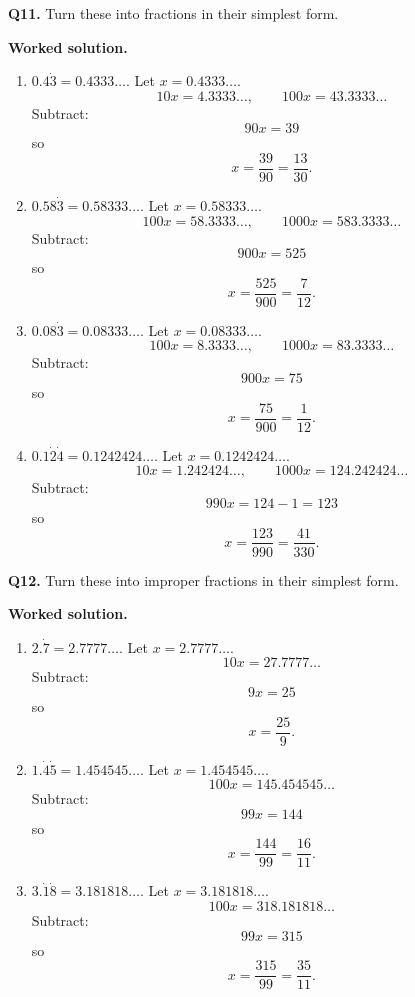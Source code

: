 \documentclass[12pt,a4paper]{article}
\newcommand{\wsol}{%
  \par\smallskip
  \noindent\textbf{\color{blue!50!black}Worked solution.}\space}
\begin{document}
\medskip
\noindent\textbf{Q11.} Turn these into fractions in their simplest form.
\wsol
\begin{enumerate}[label=(\alph*),leftmargin=*]
\item $0.4\dot{3}=0.4333\ldots$. Let $x=0.4333\ldots$.
\[
10x=4.3333\ldots,\qquad 100x=43.3333\ldots
\]
Subtract:
\[
90x=39
\]
so
\[
x=\frac{39}{90}=\frac{13}{30}.
\]

\item $0.58\dot{3}=0.58333\ldots$. Let $x=0.58333\ldots$.
\[
100x=58.3333\ldots,\qquad 1000x=583.3333\ldots
\]
Subtract:
\[
900x=525
\]
so
\[
x=\frac{525}{900}=\frac{7}{12}.
\]

\item $0.08\dot{3}=0.08333\ldots$. Let $x=0.08333\ldots$.
\[
100x=8.3333\ldots,\qquad 1000x=83.3333\ldots
\]
Subtract:
\[
900x=75
\]
so
\[
x=\frac{75}{900}=\frac{1}{12}.
\]

\item $0.1\dot{2}\dot{4}=0.1242424\ldots$. Let $x=0.1242424\ldots$.
\[
10x=1.242424\ldots,\qquad 1000x=124.242424\ldots
\]
Subtract:
\[
990x=124-1=123
\]
so
\[
x=\frac{123}{990}=\frac{41}{330}.
\]
\end{enumerate}

\medskip
\noindent\textbf{Q12.} Turn these into improper fractions in their simplest form.
\wsol
\begin{enumerate}[label=(\alph*),leftmargin=*]
\item $2.\dot{7}=2.7777\ldots$. Let $x=2.7777\ldots$.
\[
10x=27.7777\ldots
\]
Subtract:
\[
9x=25
\]
so
\[
x=\frac{25}{9}.
\]

\item $1.\dot{4}\dot{5}=1.454545\ldots$. Let $x=1.454545\ldots$.
\[
100x=145.454545\ldots
\]
Subtract:
\[
99x=144
\]
so
\[
x=\frac{144}{99}=\frac{16}{11}.
\]

\item $3.\dot{1}\dot{8}=3.181818\ldots$. Let $x=3.181818\ldots$.
\[
100x=318.181818\ldots
\]
Subtract:
\[
99x=315
\]
so
\[
x=\frac{315}{99}=\frac{35}{11}.
\]
\end{enumerate}
\end{document}
